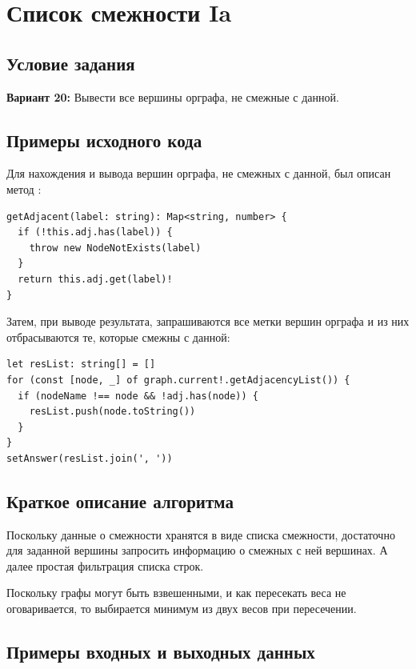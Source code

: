 \section{Список смежности Ia}
\subsection{Условие задания}
\textbf{Вариант 20:} Вывести все вершины орграфа, не смежные с данной.

\subsection{Примеры исходного кода}
Для нахождения и вывода вершин орграфа, не смежных с данной, был
описан метод :
\begin{verbatim}
getAdjacent(label: string): Map<string, number> {
  if (!this.adj.has(label)) {
    throw new NodeNotExists(label)
  }
  return this.adj.get(label)!
}
\end{verbatim}

Затем, при выводе результата, запрашиваются все метки вершин орграфа и
из них отбрасываются те, которые смежны с данной:
\begin{verbatim}
let resList: string[] = []
for (const [node, _] of graph.current!.getAdjacencyList()) {
  if (nodeName !== node && !adj.has(node)) {
    resList.push(node.toString())
  }
}
setAnswer(resList.join(', '))
\end{verbatim}

\subsection{Краткое описание алгоритма}
Поскольку данные о смежности хранятся в виде списка смежности, достаточно
для заданной вершины запросить информацию о смежных с ней вершинах.
А далее простая фильтрация списка строк.

Поскольку графы могут быть взвешенными, и как пересекать веса не оговаривается,
то выбирается минимум из двух весов при пересечении.

\subsection{Примеры входных и выходных данных}
